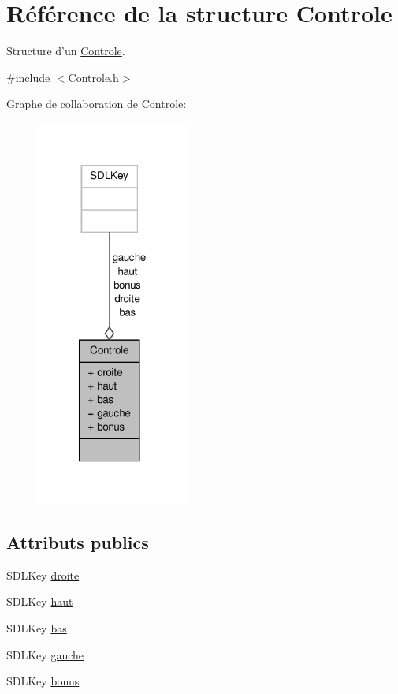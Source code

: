 \hypertarget{structControle}{\section{Référence de la structure Controle}
\label{structControle}
}


Structure d'un \hyperlink{structControle}{Controle}.  




{\ttfamily \#include $<$Controle.\-h$>$}



Graphe de collaboration de Controle\-:
\nopagebreak
\begin{figure}[H]
\begin{center}
\leavevmode
\includegraphics[width=143pt]{structControle__coll__graph}
\end{center}
\end{figure}
\subsection*{Attributs publics}
\begin{DoxyCompactItemize}
\item 
S\-D\-L\-Key \hyperlink{structControle_a1178797db7b9f5956c553feea90b828d}{droite}
\item 
S\-D\-L\-Key \hyperlink{structControle_a515a70782a9e7e6f5fbf9f99815b5ae2}{haut}
\item 
S\-D\-L\-Key \hyperlink{structControle_a5b5c96bf02d58115b53eaa683f372faf}{bas}
\item 
S\-D\-L\-Key \hyperlink{structControle_ae86d63d5b63cd831f57ce8383d5488af}{gauche}
\item 
S\-D\-L\-Key \hyperlink{structControle_ad6ce9209cfccf9b61fbaf5bc149b64e9}{bonus}
\end{DoxyCompactItemize}


